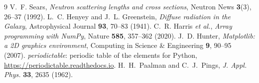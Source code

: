 \documentclass[11pt,a4paper]{report}
\begin{document}
\appendix






\begin{thebibliography}{9}
 V.~F. Sears, \emph{Neutron scattering lengths and cross sections},
  Neutron News \textbf{3}(3), 26--37 (1992).
 L.~C. Henyey and J.~L. Greenstein, \emph{Diffuse radiation in the Galaxy},
  Astrophysical Journal \textbf{93}, 70--83 (1941).
 C.~R. Harris \emph{et al.}, \emph{Array programming with NumPy},
  Nature \textbf{585}, 357--362 (2020).
 J.~D. Hunter, \emph{Matplotlib: a 2D graphics environment},
  Computing in Science \& Engineering \textbf{9}, 90--95 (2007).
 \emph{periodictable}: periodic table of the elements for Python,
  \url{https://periodictable.readthedocs.io}.
 H.~H.~Paalman and C.~J.~Pings, \emph{J. Appl. Phys.} \textbf{33}, 2635 (1962).
\end{thebibliography}
\end{document}
